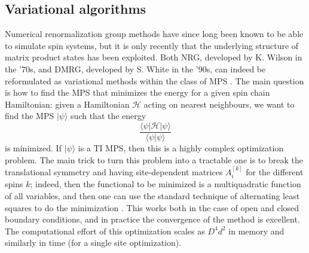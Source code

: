 \documentclass[aps,prl,epsfig,graphics,floatfix,mathbbm,a4paper]{article}
\newcommand{\1}{\mathbbm{1}}
\renewcommand{\>}{\rangle}
\newcommand{\<}{\langle}
\begin{document}
\subsection{Variational algorithms}
Numerical renormalization group methods have since long been known
to be able to simulate spin systems, but it is only recently that
the underlying structure of matrix product states has been
exploited. Both NRG, developed by K. Wilson \cite{Wilson} in the
'70s, and DMRG, developed by S. White \cite{White} in the '90s,
can indeed be reformulated as variational methods within the class
of MPS \cite{VPC04,vonDelft}. The main question is how to find the
MPS that minimizes the energy for a given spin chain Hamiltonian:
given a Hamiltonian $\mathcal{H}$ acting on nearest neighbours, we
want to find the MPS $|\psi\rangle$ such that the energy
\[\frac{\langle\psi|\mathcal{H}|\psi\rangle}{\langle\psi|\psi\rangle}\]
is minimized. If $|\psi\rangle$ is a TI MPS, then this is a highly
complex optimization problem. The main trick to turn this problem
into a tractable one is to break the translational symmetry and
having site-dependent matrices $A_i^{[k]}$ for the different spins
$k$; indeed, then the functional to be minimized is a
multiquadratic function of all variables, and then one can use the
standard technique of alternating least squares to do the
minimization \cite{VPC04}. This works both in the case of open and
closed boundary conditions, and in practice the convergence of the
method is excellent. The computational effort of this optimization
scales as  $D^4 d^2$ in memory and similarly in time (for a single
site optimization).
\end{document}
